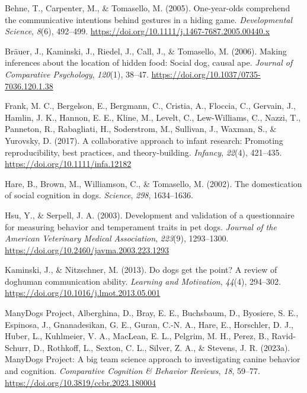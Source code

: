 \documentclass[
  pub,floatsintext]{apa6}
\newlength{\cslhangindent}
\newlength{\cslentryspacingunit} %
\newenvironment{CSLReferences}[2] %
 {%
  \setlength{\parindent}{0pt}
  \ifodd #1
  \let\oldpar\par
  \def\par{\hangindent=\cslhangindent\oldpar}
  \fi
  \setlength{\parskip}{#2\cslentryspacingunit}
 }%
 {}
\begin{document}
\hypertarget{refs}{}
\begin{CSLReferences}{1}{0}
\leavevmode{}%
Behne, T., Carpenter, M., \& Tomasello, M. (2005). One-year-olds comprehend the communicative intentions behind gestures in a hiding game. \emph{Developmental Science}, \emph{8}(6), 492--499. \url{https://doi.org/10.1111/j.1467-7687.2005.00440.x}

\leavevmode{}%
Bräuer, J., Kaminski, J., Riedel, J., Call, J., \& Tomasello, M. (2006). Making inferences about the location of hidden food: {Social} dog, causal ape. \emph{Journal of Comparative Psychology}, \emph{120}(1), 38--47. \url{https://doi.org/10.1037/0735-7036.120.1.38}

\leavevmode{}%
Frank, M. C., Bergelson, E., Bergmann, C., Cristia, A., Floccia, C., Gervain, J., Hamlin, J. K., Hannon, E. E., Kline, M., Levelt, C., Lew-Williams, C., Nazzi, T., Panneton, R., Rabagliati, H., Soderstrom, M., Sullivan, J., Waxman, S., \& Yurovsky, D. (2017). A collaborative approach to infant research: Promoting reproducibility, best practices, and theory-building. \emph{Infancy}, \emph{22}(4), 421--435. \url{https://doi.org/10.1111/infa.12182}

\leavevmode{}%
Hare, B., Brown, M., Williamson, C., \& Tomasello, M. (2002). The domestication of social cognition in dogs. \emph{Science}, \emph{298}, 1634--1636.

\leavevmode{}%
Hsu, Y., \& Serpell, J. A. (2003). Development and validation of a questionnaire for measuring behavior and temperament traits in pet dogs. \emph{Journal of the American Veterinary Medical Association}, \emph{223}(9), 1293--1300. \url{https://doi.org/10.2460/javma.2003.223.1293}

\leavevmode{}%
Kaminski, J., \& Nitzschner, M. (2013). Do dogs get the point? {A} review of dog{\textendash}human communication ability. \emph{Learning and Motivation}, \emph{44}(4), 294--302. \url{https://doi.org/10.1016/j.lmot.2013.05.001}

\leavevmode{}%
ManyDogs Project, Alberghina, D., Bray, E. E., Buchsbaum, D., Byosiere, S. E., Espinosa, J., Gnanadesikan, G. E., Guran, C.-N. A., Hare, E., Horschler, D. J., Huber, L., Kuhlmeier, V. A., MacLean, E. L., Pelgrim, M. H., Perez, B., Ravid-Schurr, D., Rothkoff, L., Sexton, C. L., Silver, Z. A., \& Stevens, J. R. (2023a). {ManyDogs Project}: {A} big team science approach to investigating canine behavior and cognition. \emph{Comparative Cognition \& Behavior Reviews}, \emph{18}, 59--77. \url{https://doi.org/10.3819/ccbr.2023.180004}


\end{CSLReferences}
\end{document}
